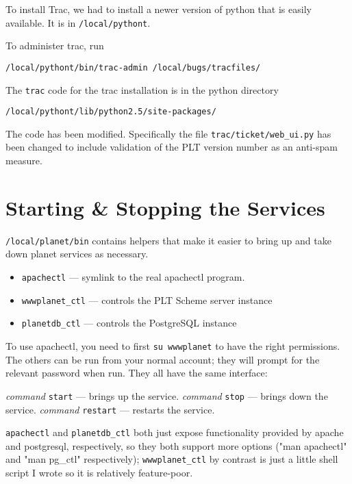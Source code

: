 \documentclass{article}
\begin{document}
To install Trac, we had to install a newer version of python that is easily available. It is in \texttt{/local/pythont}.

To administer trac, run
\begin{center}
\texttt{/local/pythont/bin/trac-admin /local/bugs/tracfiles/}
\end{center}

The \texttt{trac} code for the trac installation is in the python directory
\begin{center}
 \texttt{/local/pythont/lib/python2.5/site-packages/}
\end{center}

The code has been modified. Specifically the file \texttt{trac/ticket/web\_ui.py} has been changed to include validation of the PLT version number as an anti-spam measure.

\section{Starting \& Stopping the Services}

\texttt{/local/planet/bin} contains helpers that make it easier to bring up
and take down planet services as necessary.

\begin{itemize}
\item \texttt{apachectl} --- symlink to the real apachectl program. 
\item \texttt{wwwplanet\_ctl} --- controls the PLT Scheme server instance
\item \texttt{planetdb\_ctl} --- controls the PostgreSQL instance
\end{itemize}

To use apachectl, you need to first \texttt{su wwwplanet} to have the right
permissions. The others can be run from your normal account; they will
prompt for the relevant password when run. They all have the same
interface:

\textit{command} \texttt{start}  --- brings up the service.
\textit{command} \texttt{stop} --- brings down the service.
\textit{command} \texttt{restart} --- restarts the service.

\texttt{apachectl} and \texttt{planetdb\_ctl} both just expose
functionality provided by apache and postgresql, respectively, so they
both support more options ("man apachectl" and "man pg\_ctl"
respectively); \texttt{wwwplanet\_ctl} by contrast is just a little shell script
I wrote so it is relatively feature-poor.
\end{document}
